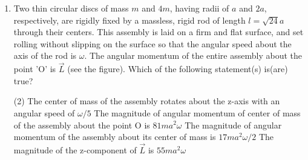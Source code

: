 
\begin{enumerate}
    \item Two thin circular discs of mass \( m \) and \( 4m \), having radii of \( a \) and \( 2a \), respectively, are rigidly fixed by a massless, rigid rod of length \( l = \sqrt{24} a \) through their centers. This assembly is laid on a firm and flat surface, and set rolling without slipping on the surface so that the angular speed about the axis of the rod is \( \omega \). The angular momentum of the entire assembly about the point 'O' is \( \vec{L} \) (see the figure). Which of the following statement(s) is(are) true?
        \begin{tasks}(2)
            \task The center of mass of the assembly rotates about the z-axis with an angular speed of \( \omega/5 \)
            \task The magnitude of angular momentum of center of mass of the assembly about the point O is \( 81ma^2\omega \)
            \task The magnitude of angular momentum of the assembly about its center of mass is \( 17ma^2\omega/2 \)
            \task The magnitude of the z-component of \( \vec{L} \) is \( 55ma^2\omega \)
        \end{tasks}
\end{enumerate}
\begin{center}
\end{center}
